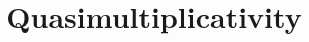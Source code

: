 \documentclass[11pt,oneside,reqno]{amsart}
\numberwithin{equation}{section}
\numberwithin{figure}{section}
\theoremstyle{theorem}
\theoremstyle{plain}
\theoremstyle{definition}
\theoremstyle{plain}
\theoremstyle{remark}
\theoremstyle{plain}
\theoremstyle{plain}
\theoremstyle{plain}
\begin{document}
\title{Quasimultiplicativity}

\maketitle




%
%
\end{document}
